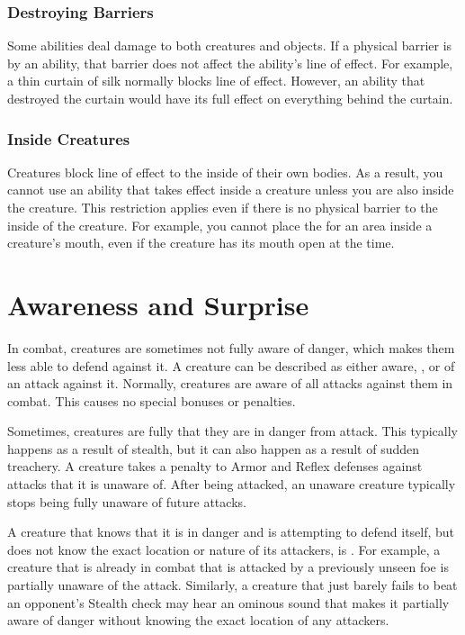         \subsubsection{Destroying Barriers}\label{Destroying Barriers}
            Some abilities deal damage to both creatures and objects.
            If a physical barrier is  by an ability, that barrier does not affect the ability's line of effect.
            For example, a thin curtain of silk normally blocks line of effect.
            However, an ability that destroyed the curtain would have its full effect on everything behind the curtain.

        \subsubsection{Inside Creatures}
            Creatures block line of effect to the inside of their own bodies.
            As a result, you cannot use an ability that takes effect inside a creature unless you are also inside the creature.
            This restriction applies even if there is no physical barrier to the inside of the creature.
            For example, you cannot place the  for an area inside a creature's mouth, even if the creature has its mouth open at the time.

\section{Awareness and Surprise}\label{Awareness and Surprise}
    In combat, creatures are sometimes not fully aware of danger, which makes them less able to defend against it.
    A creature can be described as either aware, \unaware, or \partiallyunaware of an attack against it.
    Normally, creatures are aware of all attacks against them in combat.
    This causes no special bonuses or penalties.

    Sometimes, creatures are fully \unaware that they are in danger from attack.
    This typically happens as a result of stealth, but it can also happen as a result of sudden treachery.
    A creature takes a  penalty to Armor and Reflex defenses against attacks that it is unaware of.
    After being attacked, an unaware creature typically stops being fully unaware of future attacks.

    A creature that knows that it is in danger and is attempting to defend itself, but does not know the exact location or nature of its attackers, is \partiallyunaware.
    For example, a creature that is already in combat that is attacked by a previously unseen foe is partially unaware of the attack.
    Similarly, a creature that just barely fails to beat an opponent's Stealth check may hear an ominous sound that makes it partially aware of danger without knowing the exact location of any attackers.

